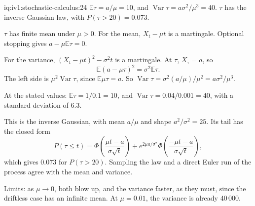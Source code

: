 \begin{solution}{iq:iv1:stochastic-calculus:24}
$\mathbb{E}\tau = a/\mu = 10$, and $\operatorname{Var}\tau = a\sigma^2/\mu^3 = 40$. $\tau$ has the inverse Gaussian law, with $P(\tau > 20) = 0.073$.

$\tau$ has finite mean under $\mu > 0$. For the mean, $X_t - \mu t$ is a martingale. Optional stopping gives $a - \mu\mathbb{E}\tau = 0$.

For the variance, $(X_t - \mu t)^2 - \sigma^2t$ is a martingale. At $\tau$, $X_\tau = a$, so
\[
\mathbb{E}(a - \mu\tau)^2 = \sigma^2\mathbb{E}\tau.
\]
The left side is $\mu^2\operatorname{Var}\tau$, since $\mathbb{E}\mu\tau = a$. So $\operatorname{Var}\tau = \sigma^2(a/\mu)/\mu^2 = a\sigma^2/\mu^3$.

At the stated values: $\mathbb{E}\tau = 1/0.1 = 10$, and $\operatorname{Var}\tau = 0.04/0.001 = 40$, with a standard deviation of $6.3$.

This is the inverse Gaussian, with mean $a/\mu$ and shape $a^2/\sigma^2 = 25$. Its tail has the closed form
\[
P(\tau \le t) = \Phi\left(\frac{\mu t - a}{\sigma\sqrt{t}}\right) + e^{2\mu a/\sigma^2}\Phi\left(\frac{-\mu t - a}{\sigma\sqrt{t}}\right),
\]
which gives $0.073$ for $P(\tau > 20)$. Sampling the law and a direct Euler run of the process agree with the mean and variance.

Limits: as $\mu \to 0$, both blow up, and the variance faster, as they must, since the driftless case has an infinite mean. At $\mu = 0.01$, the variance is already $40\,000$.



\end{solution}

